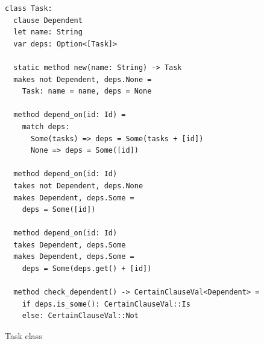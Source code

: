 \documentclass[sigconf,screen,nonacm]{acmart}
\begin{document}
\begin{figure}[H]
\begin{verbatim}
class Task:
  clause Dependent
  let name: String
  var deps: Option<[Task]>
  
  static method new(name: String) -> Task
  makes not Dependent, deps.None =
    Task: name = name, deps = None
  
  method depend_on(id: Id) =
    match deps:
      Some(tasks) => deps = Some(tasks + [id])
      None => deps = Some([id])
    
  method depend_on(id: Id)
  takes not Dependent, deps.None
  makes Dependent, deps.Some =
    deps = Some([id])
  
  method depend_on(id: Id)
  takes Dependent, deps.Some
  makes Dependent, deps.Some =
    deps = Some(deps.get() + [id])
  
  method check_dependent() -> CertainClauseVal<Dependent> =
    if deps.is_some(): CertainClauseVal::Is
    else: CertainClauseVal::Not
\end{verbatim}
    \caption{Task class}
    \label{fig:task-class}
\end{figure}



\end{document}
